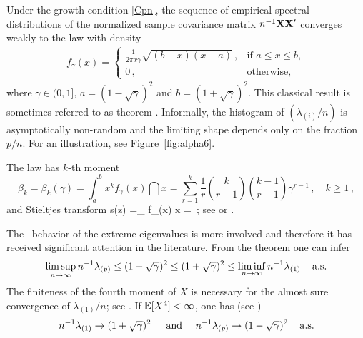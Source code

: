 Under the growth condition \eqref{Cpn}, the sequence of empirical spectral distributions of the normalized sample covariance matrix $n^{-1} {\mathbf X}{\mathbf X}'$ converges weakly to the \MP law with density
\begin{eqnarray}\label{eq:MPch4}
f_\gamma(x) = 
\left\{\begin{array}{cc}
\frac{1}{2\pi x\gamma} \sqrt{(b-x)(x-a)} \,, & \mbox{if } a\le x \le b, \\
 0 \,, & \mbox{otherwise,}
\end{array}\right.
\end{eqnarray}\noindent
where $\gamma\in (0,1]$, $a=(1 -\sqrt{\gamma})^2$ and $b=(1 +\sqrt{\gamma})^2$. This classical result is sometimes referred to as \MP theorem \cite{marchenko:pastur:1967}. Informally, the histogram of $(\lambda_{(i)}/n)$ is asymptotically non-random and the limiting shape depends only on the fraction $p/n$. For an illustration, see Figure~\ref{fig:alpha6}.
\par

The \MP law has $k$-th moment
\begin{equation}\label{eq:momentsmp}
\beta_k=\beta_k(\gamma)=\int_a^b x^k f_\gamma(x) \dint x=\sum_{r=1}^{k} \frac{1}{r} \binom{k}{r-1}\binom{k-1}{r-1}\gamma^{r-1}\,,\quad k\ge 1\,,
\end{equation}
and Stieltjes transform 
\beam\label{eq:stieltjestransform}
s(z)
=\int_{\R} f_\gamma(x) \dint x 
=  \,;
\eeam
see \cite[Chapter~3]{bai:silverstein:2010} or \cite{bai:fang:liang:2014,yao:zheng:bai:2015}.
\par

The \as~behavior of the extreme eigenvalues is more involved and therefore it has received significant attention in the literature. From the \MP theorem one can infer
\begin{equation}\label{eq:efsdf}
\limsup_{n \to \infty} n^{-1}\lambda_{(p)} \le (1-\sqrt{\gamma})^2 \le (1+\sqrt{\gamma})^2 \le \liminf_{n \to \infty} n^{-1}\lambda_{(1)}\, \quad {\rm a.s.}
\end{equation}
The finiteness of the fourth moment of $X$ is necessary for the almost sure convergence of  $\lambda_{(1)}/n$; see \cite{baisilv}.
If $\mathbb{E}[X^4]<\infty$, one has (see \cite{bai:silverstein:2010}) 
\begin{equation}\label{eq:drtgdrghdr}
n^{-1} \lambda_{(1)} \to (1+\sqrt{\gamma})^2\, \quad \text{ and } \quad n^{-1} \lambda_{(p)} \to (1-\sqrt{\gamma})^2\, \quad {\rm a.s.}
\end{equation}
\par

